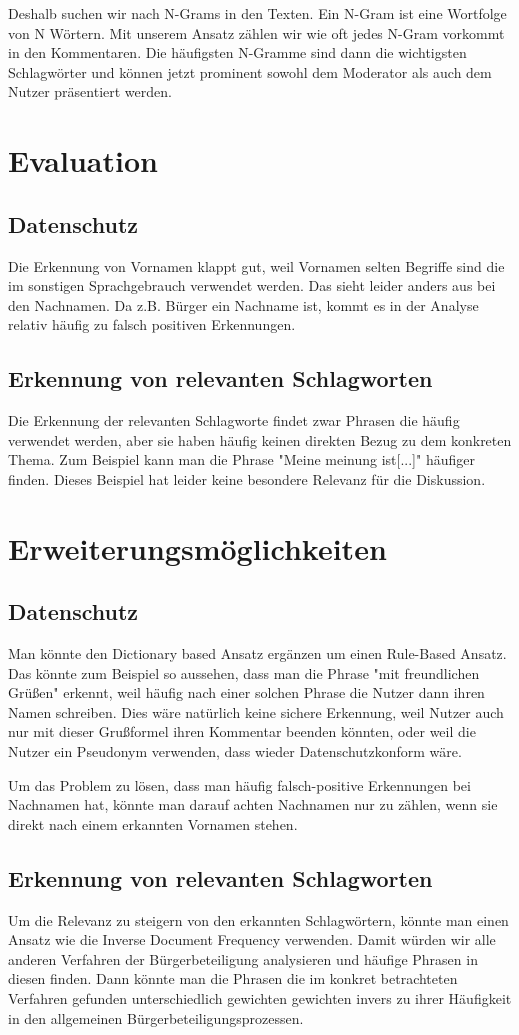 \documentclass[runningheads]{llncs}
\begin{document}
Deshalb suchen wir nach N-Grams in den Texten.
Ein N-Gram ist eine Wortfolge von N Wörtern.
Mit unserem Ansatz zählen wir wie oft jedes N-Gram vorkommt in den Kommentaren.
Die häufigsten N-Gramme sind dann die wichtigsten Schlagwörter und können jetzt prominent sowohl dem Moderator als auch dem Nutzer präsentiert werden.
\section{Evaluation}
\subsection{Datenschutz}
Die Erkennung von Vornamen klappt gut, weil Vornamen selten Begriffe sind die im sonstigen Sprachgebrauch verwendet werden.
Das sieht leider anders aus bei den Nachnamen.
Da z.B. Bürger ein Nachname ist, kommt es in der Analyse relativ häufig zu falsch positiven Erkennungen.
\subsection{Erkennung von relevanten Schlagworten}
Die Erkennung der relevanten Schlagworte findet zwar Phrasen die häufig verwendet werden, aber sie haben häufig keinen direkten Bezug zu dem konkreten Thema.
Zum Beispiel kann man die Phrase "Meine meinung ist[...]" häufiger finden.
Dieses Beispiel hat leider keine besondere Relevanz für die Diskussion.
\section{Erweiterungsmöglichkeiten}
\subsection{Datenschutz}
Man könnte den Dictionary based Ansatz ergänzen um einen Rule-Based Ansatz.
Das könnte zum Beispiel so aussehen, dass man die Phrase "mit freundlichen Grüßen" erkennt, weil häufig nach einer solchen Phrase die Nutzer dann ihren Namen schreiben.
Dies wäre natürlich keine sichere Erkennung, weil Nutzer auch nur mit dieser Grußformel ihren Kommentar beenden könnten, oder weil die Nutzer ein Pseudonym verwenden, dass wieder Datenschutzkonform wäre.

Um das Problem zu lösen, dass man häufig falsch-positive Erkennungen bei Nachnamen hat, könnte man darauf achten Nachnamen nur zu zählen, wenn sie direkt nach einem erkannten Vornamen stehen.
\subsection{Erkennung von relevanten Schlagworten}
Um die Relevanz zu steigern von den erkannten Schlagwörtern, könnte man einen Ansatz wie die Inverse Document Frequency verwenden.
Damit würden wir alle anderen Verfahren der Bürgerbeteiligung analysieren und häufige Phrasen in diesen finden.
Dann könnte man die Phrasen die im konkret betrachteten Verfahren gefunden unterschiedlich gewichten gewichten invers zu ihrer Häufigkeit in den allgemeinen Bürgerbeteiligungsprozessen. %
\end{document}
